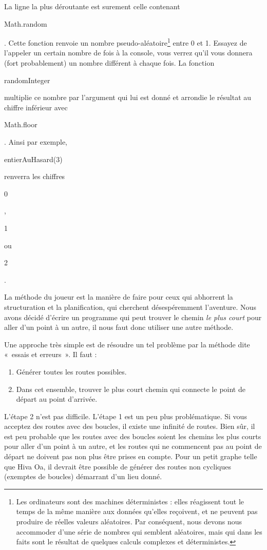 \documentclass{FramateX}
\renewcommand{\texttt}[1]{\begin{sffamily}{#1}\end{sffamily}}
\begin{document}
La ligne la plus déroutante est surement celle contenant
\texttt{Math.random}. Cette fonction renvoie un nombre
pseudo-aléatoire\footnote{Les ordinateurs sont des machines déterministes : elles réagissent tout le temps de la même manière aux données qu'elles reçoivent, et ne peuvent pas produire de réelles valeurs aléatoires. Par conséquent, nous devons nous accommoder d'une série de nombres qui semblent aléatoires, mais qui dans les faits sont le résultat de quelques calculs complexes et déterministes.} entre 0 et 1. Essayez de l'appeler un certain nombre de fois à la console, vous verrez qu'il vous donnera (fort probablement) un nombre différent à chaque fois. La fonction
\texttt{randomInteger} multiplie ce nombre par l'argument qui lui est donné et arrondie le résultat au chiffre inférieur avec
\texttt{Math.floor}. Ainsi par exemple, \texttt{entierAuHasard(3)}
renverra les chiffres \texttt{0}, \texttt{1} ou \texttt{2}.

\begin{center}\end{center}

La méthode du joueur est la manière de faire pour ceux qui abhorrent la
structuration et la planification, qui cherchent désespéremment
l'aventure. Nous avons décidé d'écrire un programme qui peut trouver le
chemin \emph{le plus court} pour aller d'un point à un autre, il nous
faut donc utiliser une autre méthode.

Une approche très simple est de résoudre un tel problème par la méthode
dite «~essais et erreurs~». Il faut :

\begin{enumerate}
\item
  Générer toutes les routes possibles.
\item
  Dans cet ensemble, trouver le plus court chemin qui connecte le point
  de départ au point d'arrivée.
\end{enumerate}
L'étape 2 n'est pas difficile. L'étape 1 est un peu plus problématique.
Si vous acceptez des routes avec des boucles, il existe une infinité de
routes. Bien sûr, il est peu probable que les routes avec des boucles
soient les chemins les plus courts pour aller d'un point à un autre, et
les routes qui ne commencent pas au point de départ ne doivent pas non
plus être prises en compte. Pour un petit graphe telle que Hiva Oa, il
devrait être possible de générer des routes non cycliques (exemptes de
boucles) démarrant d'un lieu donné.

\begin{center}\end{center}
\end{document}
